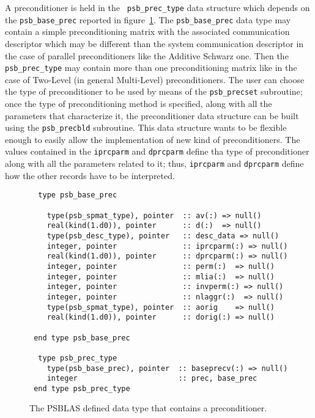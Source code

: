  A preconditioner is held in the \hypertarget{precdata}{{\tt
    psb\_prec\_type}} data structure which depends on the
\verb|psb_base_prec| reported in 
figure~\ref{fig:prectype}. The \verb|psb_base_prec| 
data type may contain a simple preconditioning matrix with the
associated communication descriptor which may be different than the
system communication descriptor in the case of parallel
preconditioners like the Additive Schwarz one. Then the
\verb|psb_prec_type| may contain more than one preconditioning matrix
like in the case of Two-Level (in general Multi-Level) preconditioners.
The user can choose the type of preconditioner to be used by means of
the \verb|psb_precset| subroutine; once the type of preconditioning
method is specified, along with all the parameters that characterize
it, the preconditioner data structure can be built using the
\verb|psb_precbld| subroutine.
This data structure wants to be flexible enough to easily allow the
implementation of new kind of preconditioners. The values contained in
the \verb|iprcparm| and \verb|dprcparm| define tha type of
preconditioner along with all the parameters related to it; thus,
\verb|iprcparm| and \verb|dprcparm| define how the other records have
to be interpreted.
\begin{figure}[h!]
  \small
  \begin{Sbox}
    \begin{minipage}[tl]{0.9\textwidth}
\begin{verbatim}
  type psb_base_prec

    type(psb_spmat_type), pointer  :: av(:) => null()
    real(kind(1.d0)), pointer      :: d(:)  => null()
    type(psb_desc_type), pointer   :: desc_data => null()
    integer, pointer               :: iprcparm(:) => null()
    real(kind(1.d0)), pointer      :: dprcparm(:) => null()
    integer, pointer               :: perm(:)  => null()
    integer, pointer               :: mlia(:)  => null()
    integer, pointer               :: invperm(:) => null()
    integer, pointer               :: nlaggr(:)  => null()
    type(psb_spmat_type), pointer  :: aorig    => null()
    real(kind(1.d0)), pointer      :: dorig(:) => null()
    
 end type psb_base_prec
  
  type psb_prec_type
    type(psb_base_prec), pointer  :: baseprecv(:) => null()
    integer                       :: prec, base_prec
 end type psb_prec_type
\end{verbatim}
    \end{minipage}
  \end{Sbox}
  \setlength{\fboxsep}{8pt}
  \begin{center}
    \fbox{\TheSbox}
  \end{center}
  \caption{\label{fig:prectype}The PSBLAS defined data type that contains a preconditioner.}
\end{figure}
